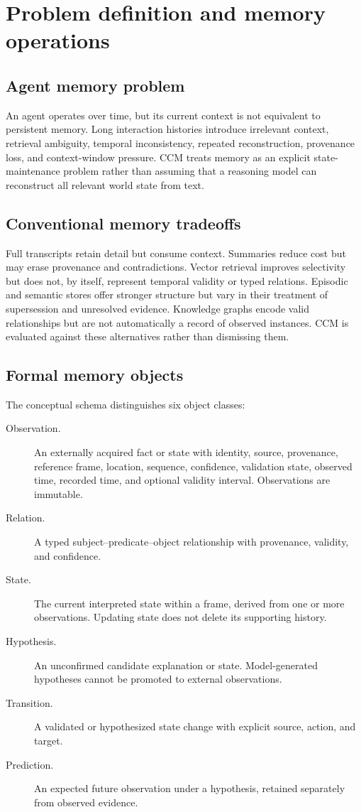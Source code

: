 \section{Problem definition and memory operations}

\subsection{Agent memory problem}

An agent operates over time, but its current context is not equivalent to persistent memory. Long interaction histories introduce irrelevant context, retrieval ambiguity, temporal inconsistency, repeated reconstruction, provenance loss, and context-window pressure. CCM treats memory as an explicit state-maintenance problem rather than assuming that a reasoning model can reconstruct all relevant world state from text.

\subsection{Conventional memory tradeoffs}

Full transcripts retain detail but consume context. Summaries reduce cost but may erase provenance and contradictions. Vector retrieval improves selectivity but does not, by itself, represent temporal validity or typed relations. Episodic and semantic stores offer stronger structure but vary in their treatment of supersession and unresolved evidence. Knowledge graphs encode valid relationships but are not automatically a record of observed instances. CCM is evaluated against these alternatives rather than dismissing them.

\subsection{Formal memory objects}

The conceptual schema distinguishes six object classes:

\begin{description}
  \item[Observation.] An externally acquired fact or state with identity, source, provenance, reference frame, location, sequence, confidence, validation state, observed time, recorded time, and optional validity interval. Observations are immutable.
  \item[Relation.] A typed subject--predicate--object relationship with provenance, validity, and confidence.
  \item[State.] The current interpreted state within a frame, derived from one or more observations. Updating state does not delete its supporting history.
  \item[Hypothesis.] An unconfirmed candidate explanation or state. Model-generated hypotheses cannot be promoted to external observations.
  \item[Transition.] A validated or hypothesized state change with explicit source, action, and target.
  \item[Prediction.] An expected future observation under a hypothesis, retained separately from observed evidence.
\end{description}

